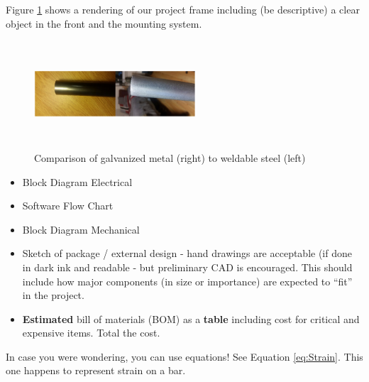\documentclass[12pt]{article}
\begin{document}


Figure \ref{fig:frame} shows a rendering of our project frame including (be descriptive) a clear object in the front and the mounting system.

\begin{figure}[H]
\centering
    \includegraphics[width=6cm,height=4cm]{figure4}
    \caption{Comparison of galvanized metal (right) to weldable steel (left)}
    \label{fig:frame}
\end{figure}




\begin{itemize}
\item Block Diagram Electrical
\item Software Flow Chart
\item Block Diagram Mechanical
\item Sketch of package / external design - hand drawings are acceptable (if done in dark ink and readable - but preliminary CAD is encouraged. This should include how major components (in size or importance) are expected to “fit” in the project.
\item \textbf{Estimated}  bill of materials (BOM) as a \textbf{table} including cost for critical and expensive items. Total the cost. 
\end{itemize}


In case you were wondering, you can use equations! See Equation \ref{eq:Strain}. This one happens to represent strain on a bar.
\end{document}
